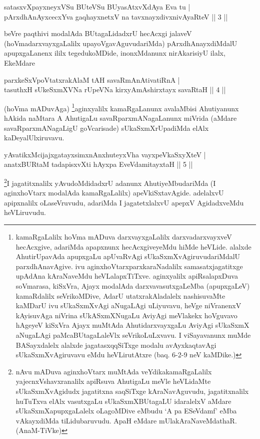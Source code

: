 \begin{shl}
satasxvXpayxneyxVSu BUteVSu BUyasAtxvXdAya Eva tu | \\
pArxdhAnAyxcecxYva gaqhayxnetxV na tavxnayxdivxnivAyaRteV \hfill ||  3 || 
\end{shl}

\begin{artha}
beVre paqthivi modalAda BUtagaLidadxrU hecAcxgi jalaveV (hoVmadarxvayxgaLalilx upayoVgavAguvudariMda) pArxdhAnayxdiMdalU apupxgaLanenx ililx tegedukoMDide, inonxMdanunx nirAkarisiyU ilalx, EkeMdare \mdash 
\end{artha}

\begin{shl}
parxkeSxVpoVtatxrakAlaM tAH savaRmAnAtivatiRnA | \\
tasuthxH sUkeSxmXVNa rUpeVNa kirxyAmAshirxtayx savaRtaH \hfill ||  4 || 
\end{shl}

\begin{artha}
(hoVma mADuvAga) \footnote{kamaRgaLalilx hoVma mADuva darxvayxgaLalilx darxvadarxvayxveV hecAcxgive, adariMda apapxnunx hecAcxgiveyeMdu hiMde heVLide. alalxde AhutirUpavAda apupxgaLu apUvaRvAgi sUkaSxmXvAgiruvudariMdalU parxdhAnavAgive. ivu aginxhoVtarxparxkaraNadalilx samasatxjagatitxge upAdAna kAraNaveMdu heVLalapxTiTxve. aginxyalilx apiRsalapxDuva soVmarasa, kiSxVra, Ajayx modalAda darxvavasutxgaLeMba (apupxgaLeV) kamaRdalilx seVrikoMDive, AdarU utatxrakAladalelx nashisuvaMte kaMDarU ivu sUkaSxmXvAgi aNugaLAgi uLiyuvavu, heVge niVranenxV kAyisuvAga niVrina sUkASxmXNugaLu AviyAgi meVlakekx hoVguvavo hAgeyeV kiSxVra Ajayx muMtAda AhutidarxvayxgaLu AviyAgi sUkaSxmX aNugaLAgi paMcaBUtagaLaleVlx seVrikoLuLxvavu. I viSayavanunx muMde BASayxdalelx alalxde jagatasxqqSiTxge modalu avAyxkaqtavAgi sUkaSxmXvAgiruvavu eMdu heVLirutAtxre (baq. 6-2-9 neV kaMDike.)}aginxyalilx kamaRgaLanunx avalaMbisi Ahutiyanunx hAkida naMtara A AhutigaLu savaRparxmANagaLanunx miVrida (aMdare savaRparxmANagaLigU goVcarisade) sUkaSxmXrUpadiMda elAlx kaDeyalUlx\break iruvavu.
\end{artha}


\begin{shl}
yAvatikxMcijajxgatayxsimxnAnxhuteyxVha vayxpeVkaSxyXteV | \\
anatxBURtaM tadapisxvXti hAyxpa EveVdamitayxtaH \hfill ||  5 || 
\end{shl}

\begin{artha}
\footnote{nAvu mADuva aginxhoVtarx muMtAda veYdikakamaRgaLalilx yajecnxVshavxranalilx apiRsuva AhutigaLu meVle heVLidaMte sUkaSxmXvAgidudx jagatitxna saqSiTxge kAraNavAguvudu, jagatitxnalilx huTuTxva elAlx vasutxgaLu sUkaSxmXBUtagaLU idaralelxV aMdare sUkaSxmXapupxgaLalelx oLagoMDive eMbudu `A pa ESeVdamf' eMba vAkayxdiMda tiLidubaruvudu. ApaH eMdare mUlakAraNaveMdathaR. (AnaM-TiVke)}I jagatitxnalilx yAvudoMdidadxrU adanunx AhutiyeMbudariMda (I aginxhoVtarx modalAda kamaRgaLalilx) apeVkiSxtavAgide. adelalxvU apipxnalilx oLaseVruvudu, adariMda I jagatetxlalxvU apepxV AgidadxveMdu heVLiruvudu.
\end{artha}

